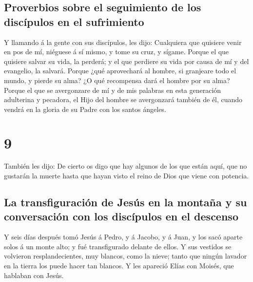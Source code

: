 \hypertarget{proverbios-sobre-el-seguimiento-de-los-discuxedpulos-en-el-sufrimiento}{%
\subsection{Proverbios sobre el seguimiento de los discípulos en el
sufrimiento}\label{proverbios-sobre-el-seguimiento-de-los-discuxedpulos-en-el-sufrimiento}}

 Y llamando á la gente con sus discípulos, les dijo:
Cualquiera que quisiere venir en pos de mí, niéguese á sí mismo, y tome
su cruz, y sígame.  Porque el que quisiere salvar su
vida, la perderá; y el que perdiere su vida por causa de mí y del
evangelio, la salvará.  Porque ¿qué aprovechará al
hombre, si granjeare todo el mundo, y pierde su alma?  ¿O
qué recompensa dará el hombre por su alma?  Porque el que
se avergonzare de mí y de mis palabras en esta generación adulterina y
pecadora, el Hijo del hombre se avergonzará también de él, cuando vendrá
en la gloria de su Padre con los santos ángeles.

\hypertarget{section-41-9}{%
\section{9}\label{section-41-9}}

 También les dijo: De cierto os digo que hay algunos de
los que están aquí, que no gustarán la muerte hasta que hayan visto el
reino de Dios que viene con potencia.

\hypertarget{la-transfiguraciuxf3n-de-jesuxfas-en-la-montauxf1a-y-su-conversaciuxf3n-con-los-discuxedpulos-en-el-descenso}{%
\subsection{La transfiguración de Jesús en la montaña y su conversación
con los discípulos en el
descenso}\label{la-transfiguraciuxf3n-de-jesuxfas-en-la-montauxf1a-y-su-conversaciuxf3n-con-los-discuxedpulos-en-el-descenso}}

 Y seis días después tomó Jesús á Pedro, y á Jacobo, y á
Juan, y los sacó aparte solos á un monte alto; y fué transfigurado
delante de ellos.  Y sus vestidos se volvieron
resplandecientes, muy blancos, como la nieve; tanto que ningún lavador
en la tierra los puede hacer tan blancos.  Y les apareció
Elías con Moisés, que hablaban con Jesús.

